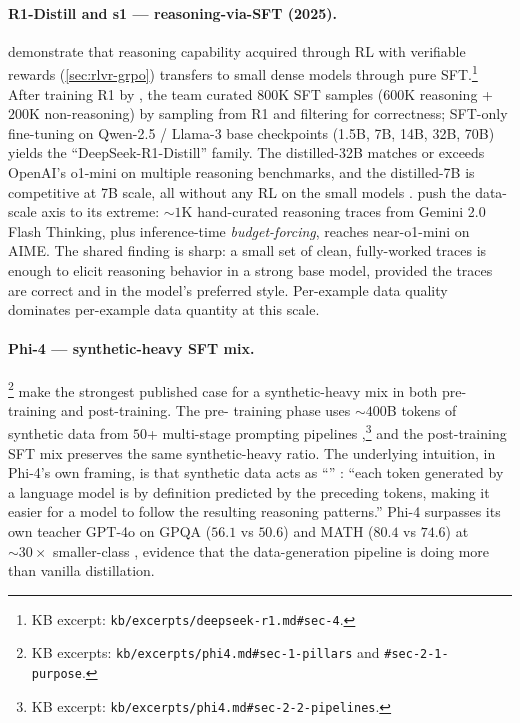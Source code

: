 \paragraph{R1-Distill and s1 — reasoning-via-SFT (2025).}
\citet[\S 4]{deepseek-r1} demonstrate that reasoning capability
acquired through RL with verifiable rewards (\cref{sec:rlvr-grpo})
transfers to small dense models through pure SFT.\footnote{KB excerpt:
\nolinkurl{kb/excerpts/deepseek-r1.md#sec-4}.} After training R1 by ,
the team curated $800$K SFT samples ($600$K reasoning + $200$K
non-reasoning) by sampling from R1 and filtering for correctness;
SFT-only fine-tuning on Qwen-2.5 / Llama-3 base checkpoints (1.5B,
7B, 14B, 32B, 70B) yields the ``DeepSeek-R1-Distill'' family. The
distilled-32B matches or exceeds OpenAI's o1-mini on multiple reasoning
benchmarks, and the distilled-7B is competitive at 7B scale, all
without any RL on the small models \citep[\S 4]{deepseek-r1}.
\citet{s1-2025} push the data-scale axis to its extreme: $\sim\!1$K
hand-curated reasoning traces from Gemini 2.0 Flash Thinking, plus
inference-time \emph{budget-forcing}, reaches near-o1-mini on AIME.
The shared finding is sharp: a small set of clean, fully-worked 
traces is enough to elicit reasoning behavior in a strong base model,
provided the traces are correct and in the model's preferred style.
Per-example data quality dominates per-example data quantity at this
scale.

\paragraph{Phi-4 — synthetic-heavy SFT mix.} \citet[\S 1, \S
2.1]{phi4}\footnote{KB excerpts:
\nolinkurl{kb/excerpts/phi4.md#sec-1-pillars} and
\texttt{\#sec-2-1-purpose}.} make the strongest published case for a
synthetic-heavy mix in both pre-training and post-training. The pre-
training phase uses $\sim\!400$B tokens of synthetic data from $50$+
multi-stage prompting pipelines \citep[\S 2.2]{phi4},\footnote{KB
excerpt: \nolinkurl{kb/excerpts/phi4.md#sec-2-2-pipelines}.} and the
post-training SFT mix preserves the same synthetic-heavy ratio. The
underlying intuition, in Phi-4's own framing, is that synthetic data
acts as ``'' \citep[\S 2.1]{phi4}: ``each token generated
by a language model is by definition predicted by the preceding
tokens, making it easier for a model to follow the resulting reasoning
patterns.'' Phi-4 surpasses its own teacher GPT-4o on GPQA ($56.1$ vs
$50.6$) and MATH ($80.4$ vs $74.6$) at $\sim\!30\times$ smaller-class
\citep[\S 1]{phi4}, evidence that the data-generation pipeline is
doing more than vanilla distillation.

